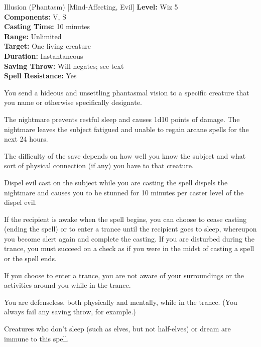 {Illusion (Phantasm) [Mind-Affecting, Evil]}
{
	\textbf{Level:}
	Wiz 5\\
	\textbf{Components:}
	V, S\\
	\textbf{Casting Time:}
	10 minutes\\
	\textbf{Range:}
	Unlimited\\
	\textbf{Target:}
	One living creature\\
	\textbf{Duration:}
	Instantaneous\\
	\textbf{Saving Throw:}
	Will negates; see text\\
	\textbf{Spell Resistance:}
	Yes\\
}
{
	You send a hideous and unsettling phantasmal vision to a specific creature that you name or otherwise specifically designate.

	The nightmare prevents restful sleep and causes 1d10 points of damage. The nightmare leaves the subject fatigued and unable to regain arcane spells for the next 24 hours.

	The difficulty of the save depends on how well you know the subject and what sort of physical connection (if any) you have to that creature.

Dispel evil cast on the subject while you are casting the spell dispels the nightmare and causes you to be stunned for 10 minutes per caster level of the dispel evil.

	If the recipient is awake when the spell begins, you can choose to cease casting (ending the spell) or to enter a trance until the recipient goes to sleep, whereupon you become alert again and complete the casting. If you are disturbed during the trance, you must succeed on a  check as if you were in the midst of casting a spell or the spell ends.

	If you choose to enter a trance, you are not aware of your surroundings or the activities around you while in the trance.

	You are defenseless, both physically and mentally, while in the trance. (You always fail any saving throw, for example.)

	Creatures who don't sleep (such as elves, but not half-elves) or dream are immune to this spell.

}

